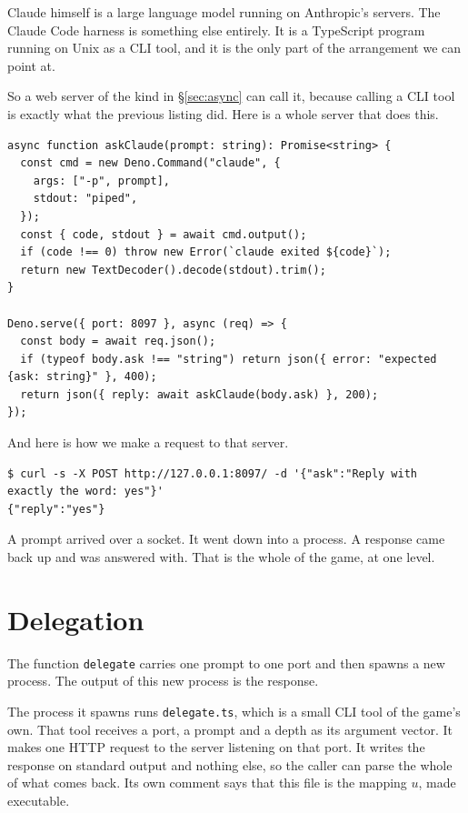\documentclass[11pt,a4paper]{article}
\begin{document}
\begin{sectionbox}
Claude himself is a large language model running on Anthropic's servers. The Claude Code harness is
something else entirely. It is a TypeScript program running on Unix as a CLI tool, and it is the
only part of the arrangement we can point at.

So a web server of the kind in \S\ref{sec:async} can call it, because calling a CLI tool is
exactly what the previous listing did. Here is a whole server that does this.

\begin{lstlisting}[language=TS]
async function askClaude(prompt: string): Promise<string> {
  const cmd = new Deno.Command("claude", {
    args: ["-p", prompt],
    stdout: "piped",
  });
  const { code, stdout } = await cmd.output();
  if (code !== 0) throw new Error(`claude exited ${code}`);
  return new TextDecoder().decode(stdout).trim();
}

Deno.serve({ port: 8097 }, async (req) => {
  const body = await req.json();
  if (typeof body.ask !== "string") return json({ error: "expected {ask: string}" }, 400);
  return json({ reply: await askClaude(body.ask) }, 200);
});
\end{lstlisting}

And here is how we make a request to that server.

\begin{lstlisting}[language=SH]
$ curl -s -X POST http://127.0.0.1:8097/ -d '{"ask":"Reply with exactly the word: yes"}'
{"reply":"yes"}
\end{lstlisting}

A prompt arrived over a socket. It went down into a process. A response came back up and was answered
with. That is the whole of the game, at one level.
\end{sectionbox}

\newpage

\section{Delegation}
\label{sec:delegation}

The function \texttt{delegate} carries one prompt to one port and then spawns a new process. The
output of this new process is the response.

The process it spawns runs \texttt{delegate.ts}, which is a small CLI tool of the game's own. That
tool receives a port, a prompt and a depth as its argument vector. It makes one HTTP request to the
server listening on that port. It writes the response on standard output and nothing else, so the
caller can parse the whole of what comes back. Its own comment says that this file is the
mapping $u$, made executable.
\end{document}
